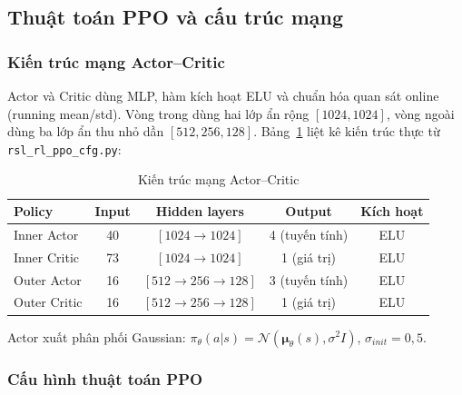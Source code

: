 \subsection{Thuật toán PPO và cấu trúc mạng}
\label{sec:ppo}

\subsubsection{Kiến trúc mạng Actor–Critic}

Actor và Critic dùng MLP, hàm kích hoạt ELU và chuẩn hóa quan sát online
(running mean/std). Vòng trong dùng hai lớp ẩn rộng $[1024,1024]$, vòng ngoài
dùng ba lớp ẩn thu nhỏ dần $[512,256,128]$. Bảng~\ref{tab:network_arch} liệt
kê kiến trúc thực từ \texttt{rsl\_rl\_ppo\_cfg.py}:

\begin{table}[H]
    \centering
    \caption{Kiến trúc mạng Actor–Critic}
    \label{tab:network_arch}
    \renewcommand{\arraystretch}{1.3}
    \begin{tabular}{|l|c|c|c|c|}
    \hline
    \textbf{Policy} & \textbf{Input} & \textbf{Hidden layers} & \textbf{Output} & \textbf{Kích hoạt} \\
    \hline
    Inner Actor  & 40 & $[1024\!\to\!1024]$         & 4 (tuyến tính) & ELU \\
    Inner Critic & 73 & $[1024\!\to\!1024]$         & 1 (giá trị)    & ELU \\
    Outer Actor  & 16 & $[512\!\to\!256\!\to\!128]$ & 3 (tuyến tính) & ELU \\
    Outer Critic & 16 & $[512\!\to\!256\!\to\!128]$ & 1 (giá trị)    & ELU \\
    \hline
    \end{tabular}
\end{table}

Actor xuất phân phối Gaussian:
$\pi_\theta(a|s)=\mathcal{N}(\boldsymbol{\mu}_\theta(s),\sigma^2 I)$,
$\sigma_{init}=0{,}5$.

\subsubsection{Cấu hình thuật toán PPO}

